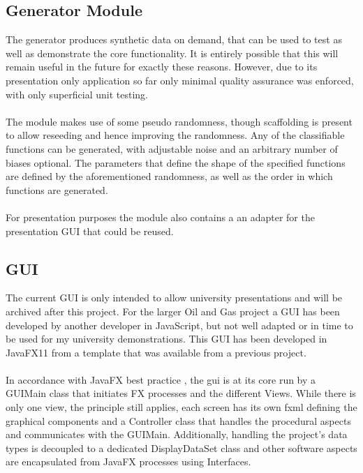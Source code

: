 \documentclass[main.tex]{subfiles}
\begin{document}
    \subsection{Generator Module}
      
      The generator produces synthetic data on demand, that can be used to test as well as demonstrate the core functionality. It is entirely possible that this will remain useful in the future for exactly these reasons. However, due to its presentation only application so far only minimal quality assurance was enforced, with only superficial unit testing.
      \\\\
      The module makes use of some pseudo randomness, though scaffolding is present to allow reseeding and hence improving the randomness. Any of the classifiable functions can be generated, with adjustable noise and an arbitrary number of biases optional. The parameters that define the shape of the specified functions are defined by the aforementioned randomness, as well as the order in which functions are generated.
      \\\\
      For presentation purposes the module also contains a an adapter for the presentation GUI that could be reused.
      
    \subsection{GUI}
      
      The current GUI is only intended to allow university presentations and will be archived after this project. For the larger Oil and Gas project a GUI has been developed by another developer in JavaScript, but not well adapted or in time to be used for my university demonstrations. This GUI has been developed in JavaFX11 from a template that was available from a previous project.
      \\\\
      In accordance with JavaFX best practice \cite{},  the gui is at its core run by a GUIMain class that initiates FX processes and the different Views. While there is only one view, the principle still applies, each screen has its own fxml defining the graphical components and a Controller class that handles the procedural aspects and communicates with the GUIMain. Additionally, handling the project's data types is decoupled to a dedicated DisplayDataSet class and other software aspects are encapsulated from JavaFX processes using Interfaces.
      
\end{document}
